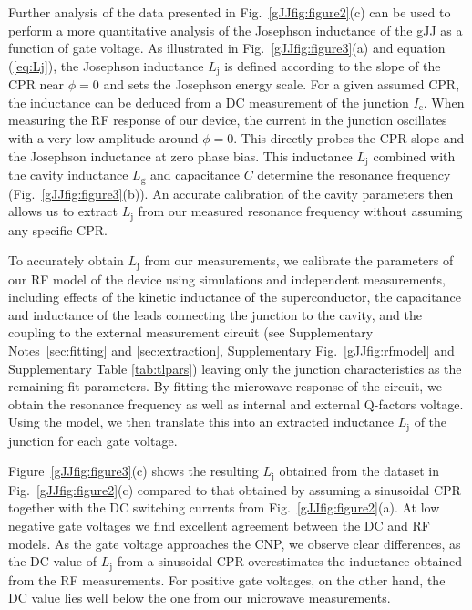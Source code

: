 Further analysis of the data presented in Fig.~\ref{gJJfig:figure2}(c) can be used to perform a more quantitative analysis of the Josephson inductance of the gJJ as a function of gate voltage.
As illustrated in Fig.~\ref{gJJfig:figure3}(a) and equation (\ref{eq:Lj}), the Josephson inductance $L_\text{j}$ is defined according to the slope of the CPR near $\phi=0$ and sets the Josephson energy scale.
For a given assumed CPR, the inductance can be deduced from a DC measurement of the junction $I_\text{c}$.
When measuring the RF response of our device, the current in the junction oscillates with a very low amplitude around $\phi=0$.
This directly probes the CPR slope and the Josephson inductance at zero phase bias.
This inductance $L_\text{j}$ combined with the cavity inductance $L_\text{g}$ and capacitance $C$ determine the resonance frequency (Fig.~\ref{gJJfig:figure3}(b)).
An accurate calibration of the cavity parameters then allows us to extract $L_\text{j}$ from our measured resonance frequency without assuming any specific CPR.

To accurately obtain $L_\text{j}$ from our measurements, we calibrate the parameters of our RF model of the device using simulations and independent measurements, including effects of the kinetic inductance of the superconductor, the capacitance and inductance of the leads connecting the junction to the cavity, and the coupling to the external measurement circuit (see Supplementary Notes~\ref{sec:fitting} and \ref{sec:extraction}, Supplementary Fig.~\ref{gJJfig:rfmodel} and Supplementary Table \ref{tab:tlpars}) leaving only the junction characteristics as the remaining fit parameters.
By fitting the microwave response of the circuit, we obtain the resonance frequency as well as internal and external Q-factors voltage.
Using the model, we then translate this into an extracted inductance $L_\text{j}$ of the junction for each gate voltage.

Figure~\ref{gJJfig:figure3}(c) shows the resulting $L_\text{j}$ obtained from the dataset in Fig.~\ref{gJJfig:figure2}(c) compared to that obtained by assuming a sinusoidal CPR together with the DC switching currents from Fig.~\ref{gJJfig:figure2}(a).
At low negative gate voltages we find excellent agreement between the DC and RF models.
As the gate voltage approaches the CNP, we observe clear differences, as the DC value of $L_\text{j}$ from a sinusoidal CPR overestimates the inductance obtained from the RF measurements.
For positive gate voltages, on the other hand, the DC value lies well below the one from our microwave measurements.

